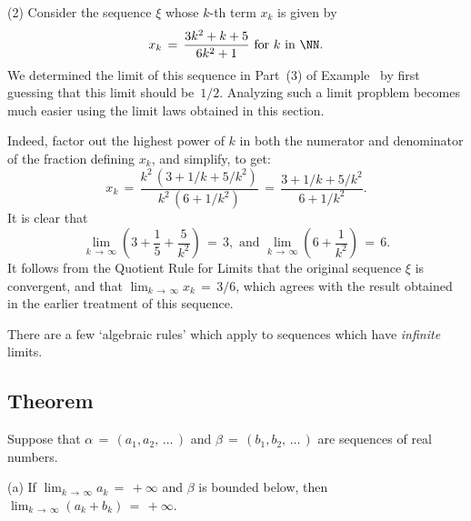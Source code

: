 \V

        (2) Consider the sequence ${\xi}$ whose $k$-th term $x_{k}$ is given by
        \begin{displaymath}
        x_{k} \,=\, \frac{3k^{2}+k+5}{6k^{2}+1} \mbox{ for $k$ in ${\NN}$}.
        \end{displaymath}
    We determined the limit of this sequence in Part~(3) of Example~ by first guessing that this limit should be~$1/2$.
    Analyzing such a limit propblem becomes much easier using the limit laws obtained in this section.

        Indeed, factor out the highest power of $k$ in both the numerator and denominator of the fraction defining $x_{k}$, and simplify, to get:
        \begin{displaymath}
        x_{k} \,=\, \frac{k^{2}\,(3 + 1/k + 5/k^{2})}{k^{2}\,(6 + 1/k^{2})}
     \,=\, 
        \frac{3 + 1/k + 5/k^{2}}{6 + 1/k^{2}}.
        \end{displaymath}
    It is clear that
        \begin{displaymath}
        \lim_{k \,{\rightarrow}\, {\infty}} \left(3 + \frac{1}{5} + \frac{5}{k^{2}}\right) \,=\, 3,
    \mbox{ and }
        \lim_{k \,{\rightarrow}\, {\infty}} \left(6 + \frac{1}{k^{2}}\right)
     \,=\, 6.
        \end{displaymath}
    It follows from the Quotient Rule for Limits that the original sequence ${\xi}$ is convergent,
    and that $\lim_{k \,{\rightarrow}\, {\infty}} x_{k} \,=\, 3/6$, which agrees with the result obtained in the earlier treatment of this sequence.

\VV

    There are a few `algebraic rules' which apply to sequences which have {\em infinite} limits.

\V

            \subsection{\small{\bf Theorem}}
            \label{ThmC60.55}

\V

        Suppose that ${\alpha} \,=\, (a_{1},a_{2},\,{\ldots}\,)$ and ${\beta} \,=\, (b_{1},b_{2},\,{\ldots}\,)$ are sequences of real numbers.

\V

        (a) If $\lim_{k \,{\rightarrow}\, {\infty}} a_{k} \,=\, +{\infty}$ and ${\beta}$ is bounded below,
    then $\lim_{k \,{\rightarrow}\, {\infty}} (a_{k} + b_{k}) \,=\, +{\infty}$.

